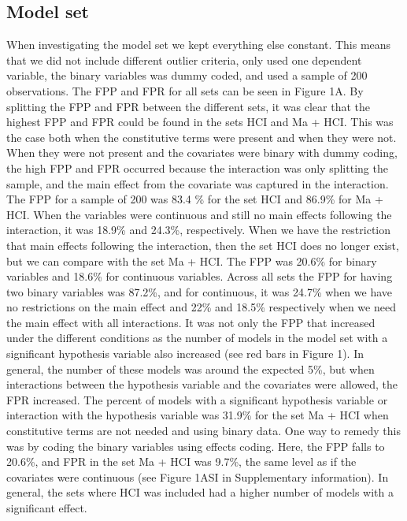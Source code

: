 \subsection{Model set}
When investigating the model set we kept everything else constant. This means that we did not include different outlier criteria, only used one dependent variable, the binary variables was dummy coded, and used a sample of 200 observations. The FPP and FPR for all sets can be seen in Figure 1A.
By splitting the FPP and FPR between the different sets, it was clear that the highest FPP and FPR could be found in the sets HCI and Ma + HCI. This was the case both when the constitutive terms were present and when they were not. When they were not present and the covariates were binary with dummy coding, the high FPP and FPR occurred because the interaction was only splitting the sample, and the main effect from the covariate was captured in the interaction. The FPP for a sample of 200 was 83.4 \% for the set HCI and 86.9\% for Ma + HCI. When the variables were continuous and still no main effects following the interaction, it was 18.9\% and 24.3\%, respectively. When we have the restriction that main effects following the interaction, then the set HCI does no longer exist, but we can compare with the set Ma + HCI. The FPP was 20.6\% for binary variables and 18.6\% for continuous variables. Across all sets the FPP for having two binary variables was 87.2\%, and for continuous, it was 24.7\% when we have no restrictions on the main effect and 22\% and 18.5\% respectively when we need the main effect with all interactions. 
It was not only the FPP that increased under the different conditions as the number of models in the model set with a significant hypothesis variable also increased (see red bars in Figure 1). In general, the number of these models was around the expected 5\%, but when interactions between the hypothesis variable and the covariates were allowed, the FPR increased. The percent of models with a significant hypothesis variable or interaction with the hypothesis variable was 31.9\% for the set Ma + HCI when constitutive terms are not needed and using binary data. One way to remedy this was by coding the binary variables using effects coding. Here, the FPP falls to 20.6\%, and FPR in the set Ma + HCI was 9.7\%, the same level as if the covariates were continuous (see Figure 1ASI in Supplementary information). In general, the sets where HCI was included had a higher number of models with a significant effect. 
